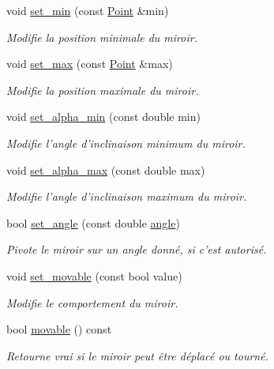 \begin{DoxyCompactItemize}
void \hyperlink{classMirror_a6abbc2665d17f8959191ec5b867f4d65}{set\+\_\+min} (const \hyperlink{classPoint}{Point} \&min)
\begin{DoxyCompactList}\small\item\em Modifie la position minimale du miroir. \end{DoxyCompactList}\item 
void \hyperlink{classMirror_a667e427c4d466d0a40715f5584977b53}{set\+\_\+max} (const \hyperlink{classPoint}{Point} \&max)
\begin{DoxyCompactList}\small\item\em Modifie la position maximale du miroir. \end{DoxyCompactList}\item 
void \hyperlink{classMirror_aa00abc76e86867b93f114e7cef6e07c0}{set\+\_\+alpha\+\_\+min} (const double min)
\begin{DoxyCompactList}\small\item\em Modifie l’angle d’inclinaison minimum du miroir. \end{DoxyCompactList}\item 
void \hyperlink{classMirror_a2ca09d04d47d75a7e67398563b94b6e3}{set\+\_\+alpha\+\_\+max} (const double max)
\begin{DoxyCompactList}\small\item\em Modifie l’angle d’inclinaison maximum du miroir. \end{DoxyCompactList}\item 
bool \hyperlink{classMirror_a86f8901b0db8666b98251b32ca946b5e}{set\+\_\+angle} (const double \hyperlink{classMirror_a70b7d41a7df7213da8f8c4ac4c873739}{angle})
\begin{DoxyCompactList}\small\item\em Pivote le miroir sur un angle donné, si c'est autorisé. \end{DoxyCompactList}\item 
void \hyperlink{classMirror_ae092fb48cbf523d50fa97c6b7fe149da}{set\+\_\+movable} (const bool value)
\begin{DoxyCompactList}\small\item\em Modifie le comportement du miroir. \end{DoxyCompactList}\item 
bool \hyperlink{classMirror_adb9bc206e3a5334909a70529ebdf6d09}{movable} () const 
\begin{DoxyCompactList}\small\item\em Retourne vrai si le miroir peut être déplacé ou tourné. \end{DoxyCompactList}\item 

\end{DoxyCompactItemize}

